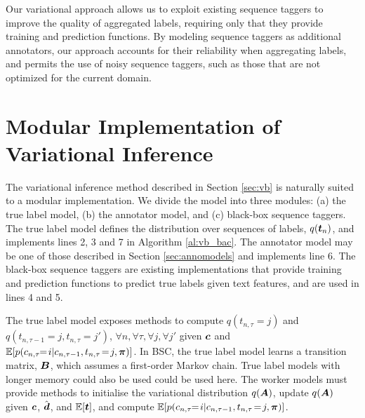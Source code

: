 Our variational approach allows us to exploit existing sequence taggers to improve 
the quality of aggregated labels,
requiring only that they provide training and prediction functions.
By modeling sequence taggers as additional annotators, our approach accounts for their reliability when aggregating labels, and permits the use of noisy
sequence taggers, such as those that are not optimized for the current domain. %
%
 
\section{Modular Implementation of Variational Inference} \label{seq:modular}
 
The variational inference method described in Section  \ref{sec:vb}
is naturally suited to a modular implementation. We divide the model into 
three modules: (a) the true label model, (b) the annotator model, and (c) black-box sequence taggers.
The true label model defines the distribution over sequences of labels, $q(\boldsymbol t_n)$, 
and implements lines 2, 3 and 7 in Algorithm \ref{al:vb_bac}. The annotator model 
may be one of those described in Section \ref{sec:annomodels} and implements line 6.
The black-box sequence taggers are existing implementations that provide training and prediction functions
to predict true labels given text features, and are used in lines 4 and 5.

The true label model exposes methods to compute 
$q(t_{n,\tau}=j)$ and $q(t_{n,\tau-1}=j, t_{n,\tau}=j')$, $\forall n,\forall \tau,\forall j,\forall j'$
given $\boldsymbol c$ and $\mathbb{E}[p( c_{n,\tau} \!\!=\! i | c_{n,\tau-1}, t_{n,\tau} \!=\! j, \boldsymbol\pi )]$.
In BSC, the true label model learns a transition matrix,
$\boldsymbol B$, which assumes a first-order Markov chain. True label models with 
longer memory could also be used could be used here. 
The worker models must provide methods to initialise the variational distribution $q(\boldsymbol A)$,
update $q(\boldsymbol A)$ given $\boldsymbol c$, $\hat{\boldsymbol{d}}$, and $\mathbb{E}[\boldsymbol t]$, and
compute $\mathbb{E}[p( c_{n,\tau} \!\!=\! i | c_{n,\tau-1}, t_{n,\tau} \!=\! j, \boldsymbol\pi )]$.

